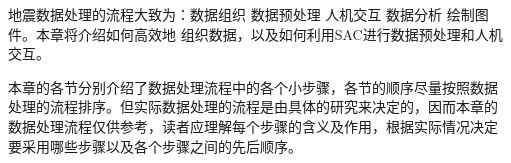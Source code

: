 地震数据处理的流程大致为：数据组织  数据预处理 
人机交互  数据分析  绘制图件。本章将介绍如何高效地
组织数据，以及如何利用SAC进行数据预处理和人机交互。

本章的各节分别介绍了数据处理流程中的各个小步骤，各节的顺序尽量按照数据
处理的流程排序。但实际数据处理的流程是由具体的研究来决定的，因而本章的
数据处理流程仅供参考，读者应理解每个步骤的含义及作用，根据实际情况决定
要采用哪些步骤以及各个步骤之间的先后顺序。
